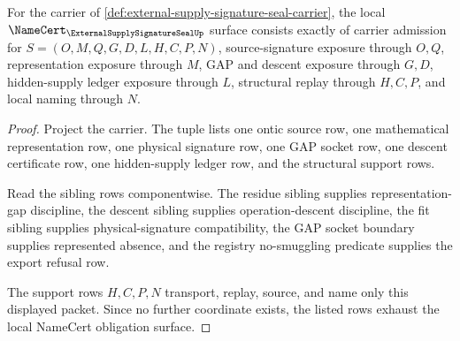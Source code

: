 \begin{theorem}
\label{thm:external-supply-signature-seal-namecert-obligations}
For the carrier of \autoref{def:external-supply-signature-seal-carrier}, the local $\NameCert_{\ExternalSupplySignatureSealUp}$ surface consists exactly of carrier admission for $S=(O,M,Q,G,D,L,H,C,P,N)$, source-signature exposure through $O,Q$, representation exposure through $M$, GAP and descent exposure through $G,D$, hidden-supply ledger exposure through $L$, structural replay through $H,C,P$, and local naming through $N$.
\end{theorem}
\begin{proof}
Project the carrier. The tuple lists one ontic source row, one mathematical representation row, one physical signature row, one GAP socket row, one descent certificate row, one hidden-supply ledger row, and the structural support rows.

Read the sibling rows componentwise. The residue sibling supplies representation-gap discipline, the descent sibling supplies operation-descent discipline, the fit sibling supplies physical-signature compatibility, the GAP socket boundary supplies represented absence, and the registry no-smuggling predicate supplies the export refusal row.

The support rows $H,C,P,N$ transport, replay, source, and name only this displayed packet. Since no further coordinate exists, the listed rows exhaust the local NameCert obligation surface.
\end{proof}

